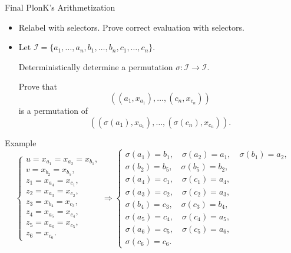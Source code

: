 \documentclass{beamer}
\newcommand{\wireindices}{\mathcal{I}}
\begin{document}
	\begin{frame}{Final PlonK's Arithmetization}
		\begin{itemize}
			\item Relabel with selectors. Prove correct evaluation with selectors.
			\item Let $\wireindices = \{a_1, \dots, a_n, b_1, \dots, b_n, c_1, \dots, c_n\}$. 
			
			Deterministically determine a permutation $\sigma : \wireindices \to \wireindices$. 
			
			Prove that
			\begin{equation*}
				\left((a_1, x_{a_1}), \dots, (c_n, x_{c_n})\right)
			\end{equation*}
			is a permutation of 
			\begin{equation*}
				\left((\sigma(a_1), x_{a_1}), \dots, (\sigma(c_n), x_{c_n})\right).
			\end{equation*}
		\end{itemize}
	\end{frame}
	\begin{frame}{Example}
		$$\begin{cases}
				u = x_{a_1} = x_{a_2} = x_{b_1},\\
				v = x_{b_2} = x_{b_5},\\
				z_1 = x_{a_4} = x_{c_1},\\
				z_2 = x_{a_3} = x_{c_2},\\
				z_3 = x_{b_4} = x_{c_3},\\
				z_4 = x_{a_5} = x_{c_4},\\
				z_5 = x_{a_6} = x_{c_5},\\
				z_6 = x_{c_6}.
			\end{cases} \Rightarrow \begin{cases}
				\sigma(a_1) = b_1,\quad \sigma(a_2) = a_1, \quad\sigma(b_1) = a_2,\\
				\sigma(b_2) = b_5, \quad \sigma(b_5) = b_2,\\
				\sigma(a_4) = c_1, \quad\sigma(c_1) = a_4,\\
				\sigma(a_3) = c_2, \quad\sigma(c_2) = a_3,\\
				\sigma(b_4) = c_3, \quad\sigma(c_3) = b_4,\\
				\sigma(a_5) = c_4, \quad\sigma(c_4) = a_5,\\
				\sigma(a_6) = c_5, \quad\sigma(c_5) = a_6,\\
				\sigma(c_6) = c_6.
			\end{cases}$$
	\end{frame}
\end{document}
